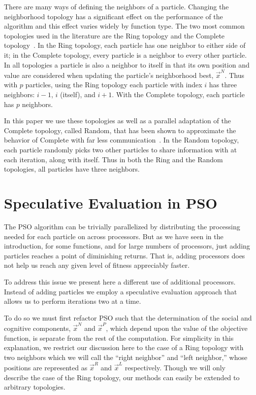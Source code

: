 \documentclass[journal,letterpaper]{IEEEtran}
\providecommand{\pers}{\ensuremath{P}}
\providecommand{\neigh}{\ensuremath{N}}
\providecommand{\leftind}{\ensuremath{L}}
\providecommand{\rightind}{\ensuremath{R}}
\providecommand{\nbest}{\ensuremath{\Vec{x}^\neigh}}
\providecommand{\pbest}{\ensuremath{\Vec{x}^\pers}}
\providecommand{\leftn}{\ensuremath{\Vec{x}^\leftind}}
\providecommand{\rightn}{\ensuremath{\Vec{x}^\rightind}}
\begin{document}
There are many ways of defining the neighbors of a particle.  Changing the
neighborhood topology has a significant effect on the performance of the
algorithm and this effect varies widely by function type.  The two most common
topologies used in the literature are the Ring topology and the Complete
topology~\cite{bratton-2007-defining-a-standard-for-pso}.  In the Ring
topology, each particle has one neighbor to either side of it; in the Complete
topology, every particle is a neighbor to every other particle.  In all
topologies a particle is also a neighbor to itself in that its own position and
value are considered when updating the particle's neighborhood best, $\nbest$.
Thus with $p$ particles, using the Ring topology each particle with index $i$
has three neighbors: $i-1$, $i$ (itself), and $i+1$.  With the Complete
topology, each particle has $p$ neighbors.

In this paper we use these topologies as well as a parallel adaptation of the
Complete topology, called Random, that has been shown to approximate the
behavior of Complete with far less
communication~\cite{mcnabb-2009-large-particle-swarms}.  In the Random
topology, each particle randomly picks two other particles to share information
with at each iteration, along with itself.  Thus in both the Ring and the
Random topologies, all particles have three neighbors.

\section{Speculative Evaluation in PSO}
\label{sec:sepso}

The PSO algorithm can be trivially parallelized by distributing the processing
needed for each particle on across processors.  But as we have seen in the
introduction, for some functions, and for large numbers of processors, just
adding particles reaches a point of diminishing returns.  That is, adding
processors does not help us reach any given level of fitness appreciably
faster.

To address this issue we present here a different use of additional processors.
Instead of adding particles we employ a speculative evaluation approach that
allows us to perform iterations two at a time.

To do so we must first refactor PSO such that the determination of the social
and cognitive components, $\nbest$ and $\pbest$, which depend upon the value of
the objective function, is separate from the rest of the computation.  For
simplicity in this explanation, we restrict our discussion here to the case of
a Ring topology with two neighbors which we will call the ``right neighbor''
and ``left neighbor,'' whose positions are represented as $\rightn$ and
$\leftn$ respectively.  Though we will only describe the case of the Ring
topology, our methods can easily be extended to arbitrary topologies.
\end{document}
